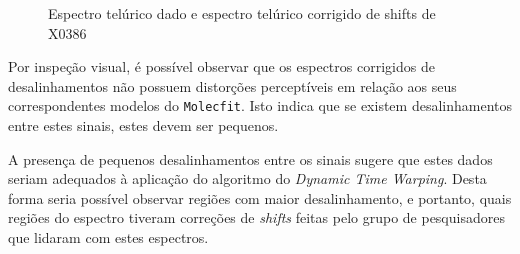 \begin{figure}[htb]
  \centering
  \hfill
  \caption{Espectro telúrico dado e espectro telúrico corrigido de shifts de X0386}
  \label{fig:x0386-gt-telluric}
\end{figure}

Por inspeção visual, é possível observar que os espectros corrigidos de desalinhamentos não possuem distorções perceptíveis em relação aos seus correspondentes modelos do \texttt{Molecfit}. Isto indica que se existem desalinhamentos entre estes sinais, estes devem ser pequenos. 

A presença de pequenos desalinhamentos entre os sinais sugere que estes dados seriam adequados à aplicação do algoritmo do \textit{Dynamic Time Warping}. Desta forma seria possível observar regiões com maior desalinhamento, e portanto, quais regiões do espectro tiveram correções de \textit{shifts} feitas pelo grupo de pesquisadores que lidaram com estes espectros.

